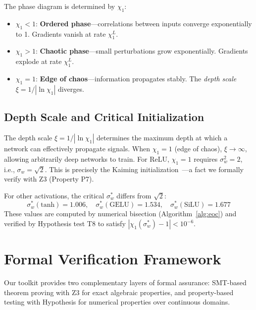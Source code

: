 \documentclass[10pt]{article}
\begin{document}
The phase diagram is determined by $\chi_1$:
\begin{itemize}[nosep]
    \item $\chi_1 < 1$: \textbf{Ordered phase}---correlations between inputs converge exponentially to 1. Gradients vanish at rate $\chi_1^L$.
    \item $\chi_1 > 1$: \textbf{Chaotic phase}---small perturbations grow exponentially. Gradients explode at rate $\chi_1^L$.
    \item $\chi_1 = 1$: \textbf{Edge of chaos}---information propagates stably. The \emph{depth scale} $\xi = 1/|\ln \chi_1|$ diverges.
\end{itemize}

\subsection{Depth Scale and Critical Initialization}

The depth scale $\xi = 1/|\ln \chi_1|$ determines the maximum depth at which a network can effectively propagate signals.
When $\chi_1 = 1$ (edge of chaos), $\xi \to \infty$, allowing arbitrarily deep networks to train.
For ReLU, $\chi_1 = 1$ requires $\sigma_w^2 = 2$, i.e., $\sigma_w = \sqrt{2}$.
This is precisely the Kaiming initialization~\cite{he2015delving}---a fact we formally verify with Z3 (Property P7).

For other activations, the critical $\sigma_w^*$ differs from $\sqrt{2}$:
\begin{equation}
    \sigma_w^*(\text{tanh}) = 1.006, \quad
    \sigma_w^*(\text{GELU}) = 1.534, \quad
    \sigma_w^*(\text{SiLU}) = 1.677
\end{equation}
These values are computed by numerical bisection (Algorithm~\ref{alg:eoc}) and verified by Hypothesis test T8 to satisfy $|\chi_1(\sigma_w^*) - 1| < 10^{-6}$.

\section{Formal Verification Framework}
\label{sec:verification}

Our toolkit provides two complementary layers of formal assurance: SMT-based theorem proving with Z3 for exact algebraic properties, and property-based testing with Hypothesis for numerical properties over continuous domains.
\end{document}
